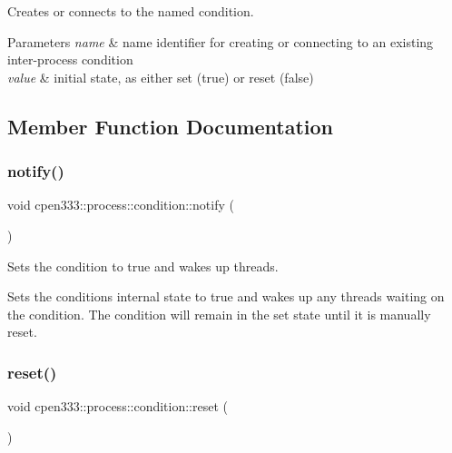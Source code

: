 Creates or connects to the named condition. 


\begin{DoxyParams}{Parameters}
{\em name} & name identifier for creating or connecting to an existing inter-\/process condition \\
\hline
{\em value} & initial state, as either set ({\ttfamily true}) or reset ({\ttfamily false}) \\
\hline
\end{DoxyParams}


\subsection{Member Function Documentation}
\mbox{\label{classcpen333_1_1process_1_1condition_a7819f5c1e213863214a4935b0157fd8c}} 
\subsubsection{\texorpdfstring{notify()}{notify()}}
{\footnotesize\ttfamily void cpen333\+::process\+::condition\+::notify (\begin{DoxyParamCaption}{ }\end{DoxyParamCaption})\hspace{0.3cm}{\ttfamily [inline]}}



Sets the condition to {\ttfamily true} and wakes up threads. 

Sets the condition\textquotesingle{}s internal state to {\ttfamily true} and wakes up any threads waiting on the condition. The condition will remain in the {\ttfamily set} state until it is manually reset. \mbox{\label{classcpen333_1_1process_1_1condition_a6b3f2a59fa85ddc3d53b60bd1a6a8556}} 
\subsubsection{\texorpdfstring{reset()}{reset()}}
{\footnotesize\ttfamily void cpen333\+::process\+::condition\+::reset (\begin{DoxyParamCaption}{ }\end{DoxyParamCaption})\hspace{0.3cm}{\ttfamily [inline]}}



